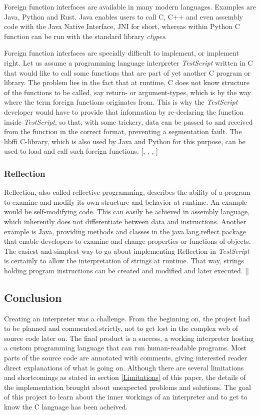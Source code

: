 \documentclass[12pt,a4paper]{article}
\newcommand{\name}{\emph{TestScript}}
\begin{document}
Foreign function interfaces are available in many modern languages.
Examples are Java, Python and Rust.
Java enables users to call C, C++ and even assembly code with the Java Native
Interface, JNI for short, whereas within Python C function can
be run with the standard library \emph{ctypes}.

Foreign function interfaces are specially difficult to implement, or implement
right. Let us assume a programming language interpreter \name{} written in C that
would like to call some functions that are part of yet another C program or
library. The problem lies in the fact that at runtime, C does not know
structure of the functions to be called, say return- or argument-types, which
is by the way where the term foreign functions originates from. This is why the
\name{} developer would have to provide that information by re-declaring the
function inside \name{}, so that, with some trickery, data can be passed to and
received from the function in the correct format, preventing a segmentation
fault. The libffi C-library, which is also used by Java and
Python for this purpose, can be used to load and call such foreign functions.
[, , , ]

\subsubsection{Reflection}
Reflection, also called reflective programming, describes
the ability of a program to examine and modify its own structure and behavior 
at runtime. An example would be self-modifying code. This can easily be
achieved in assembly language, which inherently does not differentiate between
data and instructions.
Another example is Java, providing methods and classes in the java.lang.reflect
package that enable developers to examine and change properties or functions
of objects.
The easiest and simplest way to go about implementing Reflection in \name{} is
certainly to allow the interpretation of strings at runtime. That way, strings
holding program instructions can be created and modified and later executed.
[]

\subsection{Conclusion}
Creating an interpreter was a challenge. From the beginning on, the project
had to be planned and commented strictly, not to get lost in the complex web
of source code later on. The final product is a success, a working interpreter
hosting a custom programming language that can run human-readable programs.
Most parts of the source code are annotated with comments, giving interested
reader direct explanations of what is going on.
Although there are several limitations and shortcomings as stated in section \ref{Limitations}
of this paper, the details of the implementation brought about unexpected 
problems and solutions. The goal of this project to learn about 
the inner workings of an interpreter and
to get to know the C language has been acheived.
\end{document}
